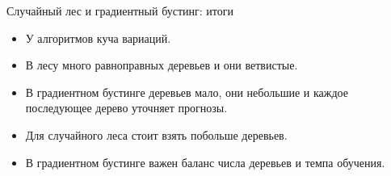   \begin{frame}{Случайный лес и градиентный бустинг: итоги}
  
    \begin{itemize}[<+->]
      \item У алгоритмов \alert{куча вариаций}.
      \item В лесу много \alert{равноправных деревьев} и они \alert{ветвистые}.
      \item В градиентном бустинге деревьев мало, они \alert{небольшие} и каждое последующее дерево \alert{уточняет} прогнозы. 
      \item Для случайного леса стоит взять \alert{побольше деревьев}. 
      \item В градиентном бустинге важен баланс \alert{числа деревьев} и \alert{темпа обучения}. 
    \end{itemize}
  \end{frame}
  
  
  
  